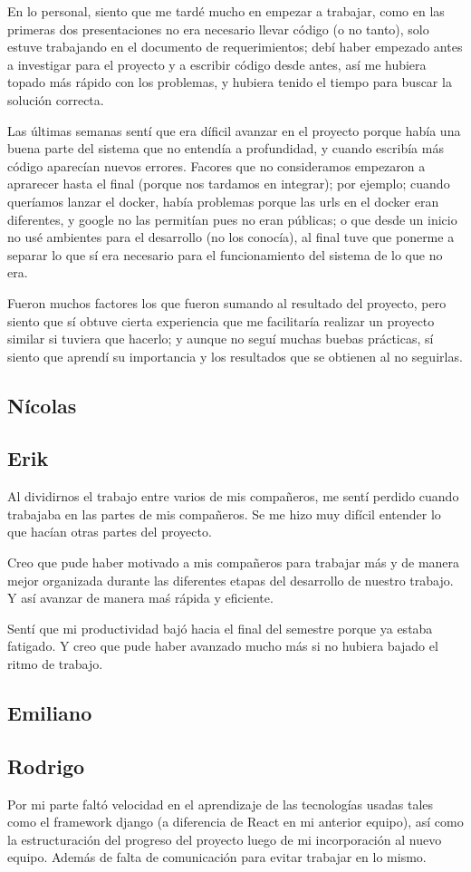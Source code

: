 \documentclass[12pt]{article}
\newcounter{ni}
\begin{document}
En lo personal, siento que me tardé mucho en empezar a trabajar, como en las primeras dos presentaciones no era necesario llevar código (o no tanto), solo estuve trabajando en el documento de requerimientos; debí haber empezado antes a investigar para el proyecto y a escribir código desde antes, así me hubiera topado más rápido con los problemas, y hubiera tenido el tiempo para buscar la solución correcta.

Las últimas semanas sentí que era díficil avanzar en el proyecto porque había una buena parte del sistema que no entendía a profundidad, y cuando escribía más código aparecían nuevos errores. Facores que no consideramos empezaron a aprarecer hasta el final (porque nos tardamos en integrar); por ejemplo; cuando queríamos lanzar el docker, había problemas porque las urls en el docker eran diferentes, y google no las permitían pues no eran públicas; o que desde un inicio no usé ambientes para el desarrollo (no los conocía), al final tuve que ponerme a separar lo que sí era necesario para el funcionamiento del sistema de lo que no era.

Fueron muchos factores los que fueron sumando al resultado del proyecto, pero siento que sí obtuve cierta experiencia que me facilitaría realizar un proyecto similar si tuviera que hacerlo; y aunque no seguí muchas buebas prácticas, sí siento que aprendí su importancia y los resultados que se obtienen al no seguirlas.

\subsection{Nícolas}
\subsection{Erik}
Al dividirnos el trabajo entre varios de mis compañeros, me sentí perdido cuando trabajaba en las partes de mis compañeros. Se me hizo muy difícil entender lo que hacían otras partes del proyecto.

Creo que pude haber motivado a mis compañeros para trabajar más y de manera mejor organizada durante las diferentes etapas del desarrollo de nuestro trabajo. Y así avanzar de manera maś rápida y eficiente.

Sentí que mi productividad bajó hacia el final del semestre porque ya estaba fatigado. Y creo que pude haber avanzado mucho más si no hubiera bajado el ritmo de trabajo.

\subsection{Emiliano}
\subsection{Rodrigo}
Por mi parte faltó velocidad en el aprendizaje de las tecnologías usadas tales como el framework django (a diferencia de React en mi anterior equipo),
así como la estructuración del progreso del proyecto luego de mi incorporación al nuevo equipo. Además de falta de comunicación para evitar trabajar en lo mismo.
\end{document}
